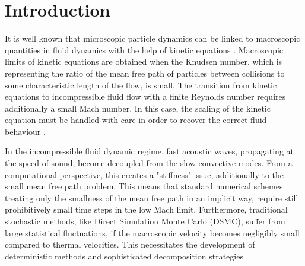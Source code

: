 \documentclass[final,11pt]{siamart251216}
\numberwithin{equation}{section}
\theoremstyle{definition}
\theoremstyle{remark}
\begin{document}
\section{Introduction}
It is well known that microscopic particle dynamics can be linked to macroscopic quantities in fluid dynamics with the help of kinetic equations \cite{Chap,Cer,Levermore91}.  Macroscopic limits of kinetic equations are obtained when  the Knudsen number, which is representing the ratio of the mean free path of particles between collisions to some characteristic length of the flow, is small. The transition from kinetic  equations to incompressible fluid flow  with a  finite Reynolds number requires additionally a small Mach number.
In this case, the scaling of the kinetic equation must be handled with care in order to recover the correct fluid behaviour
\cite{Levermore91,SR}.

In the incompressible  fluid dynamic regime, fast acoustic waves, propagating at the speed of sound, become decoupled from the slow convective modes. From a computational perspective, this creates a "stiffness" issue, additionally to the small mean free path problem. This  means that standard numerical schemes treating only the smallness of the mean free path  in an implicit way,  require still prohibitively small time steps 
in the low Mach limit.
Furthermore, traditional stochastic methods, like Direct Simulation Monte Carlo (DSMC), suffer from 
 large statistical fluctuations, if the  macroscopic velocity becomes negligibly small compared to thermal velocities. This necessitates the development of deterministic methods and sophisticated decomposition strategies \cite{TATSIOS2025113500,Dimarco_acta}.
\end{document}
